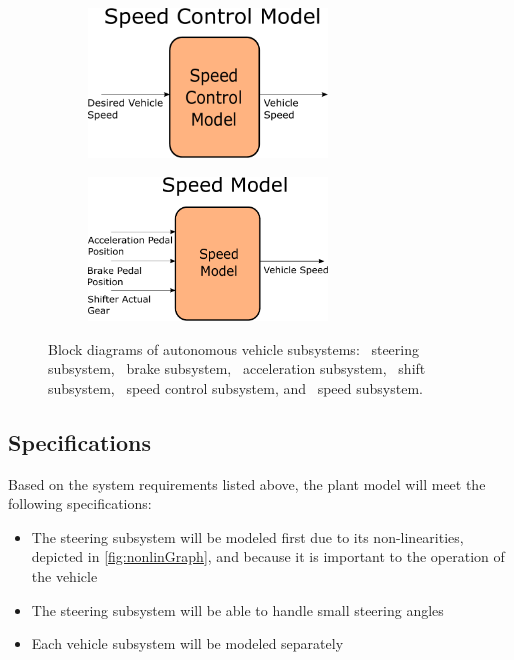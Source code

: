 \documentclass[letterpaper,12pt]{article}   %
\begin{document}
\begin{figure}[htb]
\\
\begin{subfigure}[b]{0.48\linewidth}
  \centering
  \includegraphics[width=2.5in]{figs/inkscape/speedControlModelArchitecture}
  \caption{}
  \label{fig:speedControlModelArchitecture}
\end{subfigure}
\begin{subfigure}[b]{0.48\linewidth}
  \centering
  \includegraphics[width=2.5in]{figs/inkscape/speedModelArchitecture}
  \caption{}
  \label{fig:speedModelArchitecture}
\end{subfigure}
\caption{Block diagrams of autonomous vehicle subsystems:~ steering subsystem,~ brake subsystem,~ acceleration subsystem,~ shift subsystem,~ speed control subsystem, and~ speed subsystem.}
\label{fig:subFunctionalBlock}
\end{figure}


 \subsection{Specifications}
 Based on the system requirements listed above, the plant model will meet the following specifications:
 \begin{itemize}
    \item The steering subsystem will be modeled first due to its non-linearities, depicted in \autoref{fig:nonlinGraph}, and because it is important to the operation of the vehicle 
    \item The steering subsystem will be able to handle small steering angles
    \item Each vehicle subsystem will be modeled separately
 \end{itemize}
\end{document}
